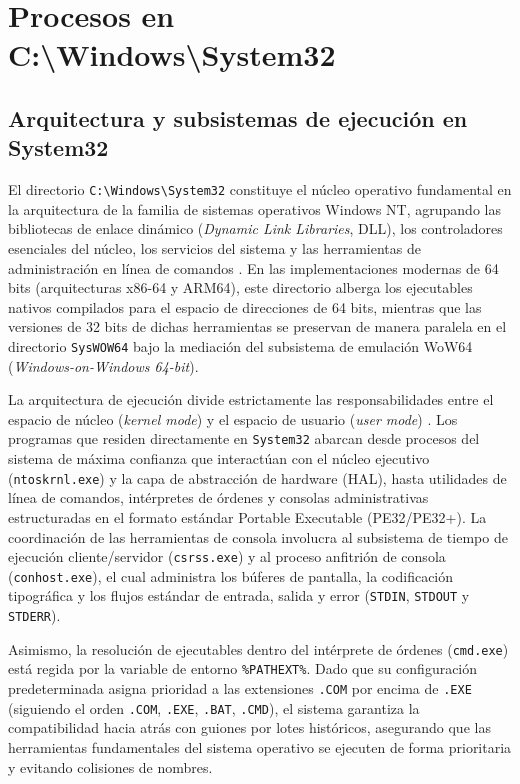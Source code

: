 \documentclass[12pt]{article}
\begin{document}
\section{Procesos en C:\textbackslash Windows\textbackslash System32}\label{sec:procesosSystem32}

\subsection{Arquitectura y subsistemas de ejecución en System32}\label{sec:arquitecturaSystem32}

El directorio \texttt{C:\textbackslash Windows\textbackslash System32} constituye el núcleo operativo fundamental en la arquitectura de la familia de sistemas operativos Windows NT, agrupando las bibliotecas de enlace dinámico (\textit{Dynamic Link Libraries}, DLL), los controladores esenciales del núcleo, los servicios del sistema y las herramientas de administración en línea de comandos \parencite[\S 21.2, pp.\ 1038--1039]{deitel2004operating}. En las implementaciones modernas de 64 bits (arquitecturas x86-64 y ARM64), este directorio alberga los ejecutables nativos compilados para el espacio de direcciones de 64 bits, mientras que las versiones de 32 bits de dichas herramientas se preservan de manera paralela en el directorio \texttt{SysWOW64} bajo la mediación del subsistema de emulación WoW64 (\textit{Windows-on-Windows 64-bit}).

La arquitectura de ejecución divide estrictamente las responsabilidades entre el espacio de núcleo (\textit{kernel mode}) y el espacio de usuario (\textit{user mode}) \parencite[\S 22.2, pp.\ 783--785]{silberschatz2006fundamentos}. Los programas que residen directamente en \texttt{System32} abarcan desde procesos del sistema de máxima confianza que interactúan con el núcleo ejecutivo (\texttt{ntoskrnl.exe}) y la capa de abstracción de hardware (HAL), hasta utilidades de línea de comandos, intérpretes de órdenes y consolas administrativas estructuradas en el formato estándar Portable Executable (PE32/PE32+). La coordinación de las herramientas de consola involucra al subsistema de tiempo de ejecución cliente/servidor (\texttt{csrss.exe}) y al proceso anfitrión de consola (\texttt{conhost.exe}), el cual administra los búferes de pantalla, la codificación tipográfica y los flujos estándar de entrada, salida y error (\texttt{STDIN}, \texttt{STDOUT} y \texttt{STDERR}).

Asimismo, la resolución de ejecutables dentro del intérprete de órdenes (\texttt{cmd.exe}) está regida por la variable de entorno \texttt{\%PATHEXT\%}. Dado que su configuración predeterminada asigna prioridad a las extensiones \texttt{.COM} por encima de \texttt{.EXE} (siguiendo el orden \texttt{.COM}, \texttt{.EXE}, \texttt{.BAT}, \texttt{.CMD}), el sistema garantiza la compatibilidad hacia atrás con guiones por lotes históricos, asegurando que las herramientas fundamentales del sistema operativo se ejecuten de forma prioritaria y evitando colisiones de nombres.
\end{document}
